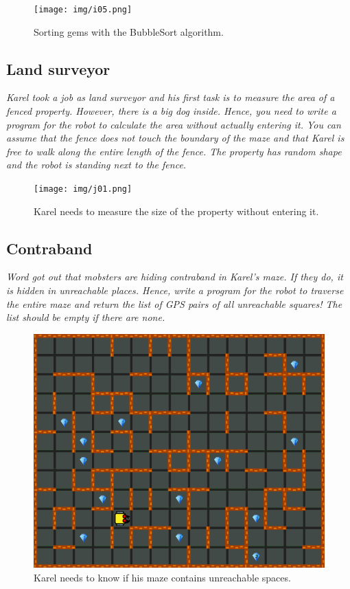 \begin{figure}[!ht]
\begin{center}
\texttt{[image: img/i05.png]}
\end{center}
\vspace{-4mm}
\caption{Sorting gems with the BubbleSort algorithm.}
\label{fig:g13}
\end{figure}

\newpage
\subsection{Land surveyor}

\noindent
{\em Karel took a job as land surveyor and his first task is to measure the area of a fenced property. However, there is a big dog inside. Hence, you need to write a program for the robot to calculate the area without actually entering it. You can assume that the fence does not touch the boundary of the maze and that Karel is free to walk along the entire length of the fence. The property has random shape and the robot is standing next to the fence.}

\begin{figure}[!ht]
\begin{center}
\texttt{[image: img/j01.png]}
\end{center}
\vspace{-4mm}
\caption{Karel needs to measure the size of the property without entering it.}
\label{fig:j01}
\end{figure}

\newpage
\subsection{Contraband}

\noindent
{\em Word got out that mobsters are hiding contraband in Karel's maze. If they do, it is hidden in unreachable places. Hence, write a program for the robot to traverse the entire maze and return the list of GPS pairs of all unreachable squares! The list should be empty if there are none.}

\begin{figure}[!ht]
\begin{center}
\includegraphics[height=0.4\textwidth]{img/j01b.png}
\end{center}
\vspace{-4mm}
\caption{Karel needs to know if his maze contains unreachable spaces.}
\label{fig:j01b}
\end{figure}


